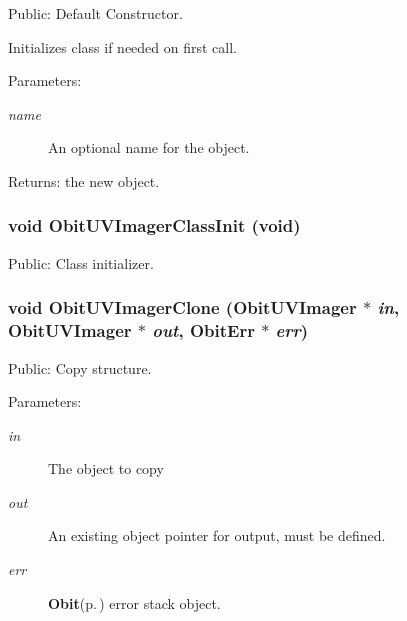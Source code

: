 Public: Default Constructor. 

Initializes class if needed on first call. \begin{Desc}
\item[Parameters:]
\begin{description}
\item[{\em name}]An optional name for the object. \end{description}
\end{Desc}
\begin{Desc}
\item[Returns:]the new object. \end{Desc}
\subsubsection{\setlength{\rightskip}{0pt plus 5cm}void Obit\-UVImager\-Class\-Init (void)}\label{ObitUVImager_8h_a11}


Public: Class initializer. 

\subsubsection{\setlength{\rightskip}{0pt plus 5cm}void Obit\-UVImager\-Clone ({\bf Obit\-UVImager} $\ast$ {\em in}, {\bf Obit\-UVImager} $\ast$ {\em out}, {\bf Obit\-Err} $\ast$ {\em err})}\label{ObitUVImager_8h_a16}


Public: Copy structure. 

\begin{Desc}
\item[Parameters:]
\begin{description}
\item[{\em in}]The object to copy \item[{\em out}]An existing object pointer for output, must be defined. \item[{\em err}]{\bf Obit}{\rm (p.\,\pageref{structObit})} error stack object. \end{description}
\end{Desc}
